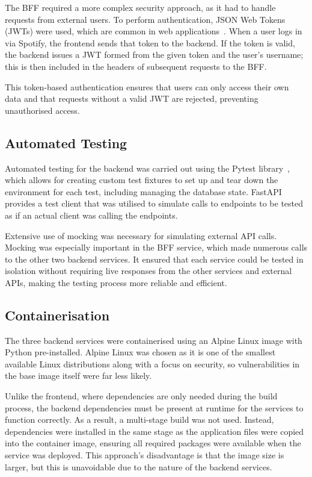 The BFF required a more complex security approach, as it had to handle requests from external users. To perform authentication, JSON Web Tokens (JWTs) were used, which are common in web applications~\cite{9320801}. When a user logs in via Spotify, the frontend sends that token to the backend. If the token is valid, the backend issues a JWT formed from the given token and the user's username; this is then included in the headers of subsequent requests to the BFF.

This token-based authentication ensures that users can only access their own data and that requests without a valid JWT are rejected, preventing unauthorised access.

\subsection{Automated Testing}
Automated testing for the backend was carried out using the Pytest library~\cite{PyTest}, which allows for creating custom test fixtures to set up and tear down the environment for each test, including managing the database state. FastAPI provides a test client that was utilised to simulate calls to endpoints to be tested as if an actual client was calling the endpoints.

Extensive use of mocking was necessary for simulating external API calls. Mocking was especially important in the BFF service, which made numerous calls to the other two backend services. It ensured that each service could be tested in isolation without requiring live responses from the other services and external APIs, making the testing process more reliable and efficient.

\subsection{Containerisation}
The three backend services were containerised using an Alpine Linux image with Python pre-installed. Alpine Linux was chosen as it is one of the smallest available Linux distributions along with a focus on security, so vulnerabilities in the base image itself were far less likely.

Unlike the frontend, where dependencies are only needed during the build process, the backend dependencies must be present at runtime for the services to function correctly. As a result, a multi-stage build was not used. Instead, dependencies were installed in the same stage as the application files were copied into the container image, ensuring all required packages were available when the service was deployed. This approach's disadvantage is that the image size is larger, but this is unavoidable due to the nature of the backend services.

